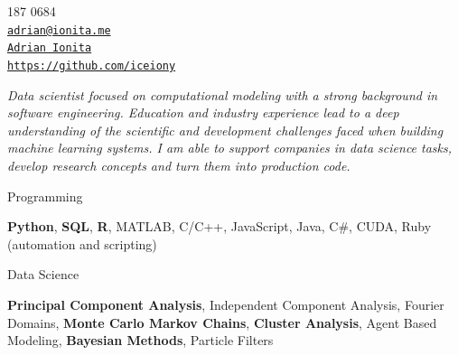 \documentclass[11pt,article,oneside]{memoir}
\makeatletter
\def\myauthor{Adrian Ionita}
\def\myemail{adrian@ionita.me}
\def\myweb{https://github.com/iceiony}
\def\myphone{0797 187 0684}
\def\mytwitter{@iceiony}
\def\mylinkedin{https://uk.linkedin.com/in/adrian-ionita-6a923129}
\makeatother
\begin{document}
%
\hfill
\begin{minipage}[t]{1.3in}
  \flushright \footnotesize  \contactblock \myphone \, \faPhone \\ 
  {\scriptsize  \texttt{\href{mailto:\myemail}{\myemail}} \, \faEnvelope} \\
  {\scriptsize  \texttt{\href{\mylinkedin}{\myauthor}} \, \faLinkedinSquare }  \\ 
  {\scriptsize  \texttt{\href{\myweb}{\myweb}} \, \faGithub}
\end{minipage}

{\vskip -0.8cm}
\reversemarginpar

\bigskip      
\medskip

\noindent\emph{Data scientist focused on computational modeling with a strong background in software engineering.
Education and industry experience lead to a deep understanding of the scientific and development challenges faced when building machine learning systems.
I am able to support companies in data science tasks, develop research concepts and turn them into production code.
}
\bigskip


\ind Programming

\ind \hspace{0.354in} \footnotesize \textbf{Python}, \textbf{SQL}, \textbf{R}, MATLAB, C/C++, JavaScript, Java, C\#, CUDA, Ruby (automation and scripting) \normalsize 

\ind Data Science

\ind \hspace{0.354in} \footnotesize \textbf{Principal Component Analysis}, Independent Component Analysis, Fourier Domains,
\textbf{Monte Carlo Markov Chains}, \textbf{Cluster Analysis}, Agent Based Modeling, \textbf{Bayesian Methods}, Particle Filters \normalsize
\end{document}
